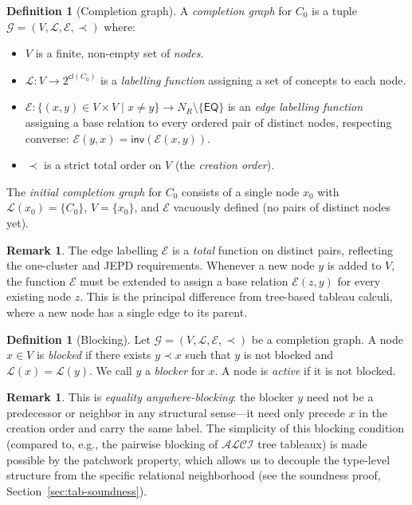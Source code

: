 \documentclass[a4paper,11pt]{article}
\theoremstyle{definition}
\newtheorem{definition}[theorem]{Definition}
\newtheorem{remark}[theorem]{Remark}
\newcommand{\ALCI}{\ensuremath{\mathcal{ALCI}}}
\newcommand{\NR}{\ensuremath{N_R}}
\newcommand{\EQ}{\ensuremath{\mathsf{EQ}}}
\newcommand{\inv}{\ensuremath{\mathsf{inv}}}
\newcommand{\cl}{\ensuremath{\mathsf{cl}}}
\begin{document}
\begin{definition}[Completion graph]
\label{def:completion-graph}
A \emph{completion graph} for $C_0$ is a tuple $\mathcal{G} = (V,
\mathcal{L}, \mathcal{E}, \prec)$ where:
\begin{itemize}[nosep]
  \item $V$ is a finite, non-empty set of \emph{nodes}.
  \item $\mathcal{L} \colon V \to 2^{\cl(C_0)}$ is a \emph{labelling
    function} assigning a set of concepts to each node.
  \item $\mathcal{E} \colon \{(x,y) \in V \times V \mid x \neq y\}
    \to \NR \setminus \{\EQ\}$ is an \emph{edge labelling function}
    assigning a base relation to every ordered pair of distinct nodes,
    respecting converse: $\mathcal{E}(y,x) = \inv(\mathcal{E}(x,y))$.
  \item $\prec$ is a strict total order on $V$ (the \emph{creation
    order}).
\end{itemize}
The \emph{initial completion graph} for $C_0$ consists of a single
node $x_0$ with $\mathcal{L}(x_0) = \{C_0\}$, $V = \{x_0\}$, and
$\mathcal{E}$ vacuously defined (no pairs of distinct nodes yet).
\end{definition}

\begin{remark}
The edge labelling $\mathcal{E}$ is a \emph{total} function on
distinct pairs, reflecting the one-cluster and JEPD requirements.
Whenever a new node $y$ is added to $V$, the function $\mathcal{E}$
must be extended to assign a base relation $\mathcal{E}(z,y)$ for
every existing node $z$.  This is the principal difference from
tree-based tableau calculi, where a new node has a single edge to its
parent.
\end{remark}

\begin{definition}[Blocking]
\label{def:blocking}
Let $\mathcal{G} = (V, \mathcal{L}, \mathcal{E}, \prec)$ be a
completion graph.  A node $x \in V$ is \emph{blocked} if there exists
$y \prec x$ such that $y$ is not blocked and $\mathcal{L}(x) =
\mathcal{L}(y)$.  We call $y$ a \emph{blocker} for $x$.  A node is
\emph{active} if it is not blocked.
\end{definition}

\begin{remark}
This is \emph{equality anywhere-blocking}: the blocker $y$ need not be
a predecessor or neighbor in any structural sense---it need only
precede $x$ in the creation order and carry the same label.  The
simplicity of this blocking condition (compared to, e.g., the pairwise
blocking of $\ALCI$ tree tableaux) is made possible by the patchwork
property, which allows us to decouple the type-level structure from
the specific relational neighborhood (see the soundness proof,
Section~\ref{sec:tab-soundness}).
\end{remark}
\end{document}
